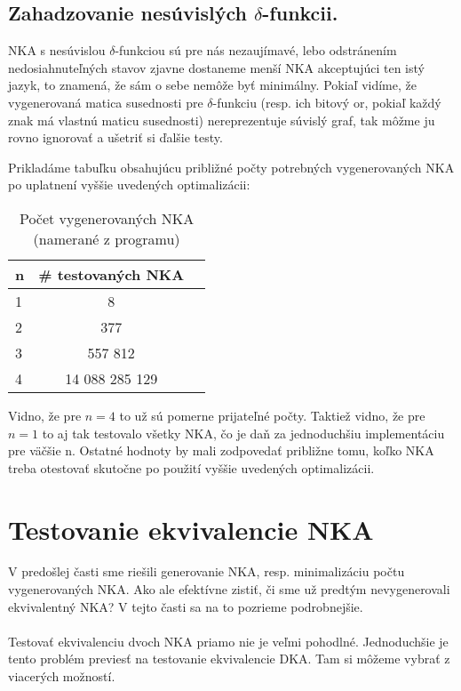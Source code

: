 \subsection{Zahadzovanie nesúvislých $\delta$-funkcii.} NKA s nesúvislou $\delta$-funkciou sú pre nás nezaujímavé, lebo odstránením nedosiahnuteľných stavov zjavne dostaneme menší NKA akceptujúci ten istý jazyk, to znamená, že sám o sebe nemôže byť minimálny. Pokiaľ vidíme, že vygenerovaná matica susednosti pre $\delta$-funkciu (resp. ich bitový or, pokiaľ každý znak má vlastnú maticu susednosti) nereprezentuje súvislý graf, tak môžme ju rovno ignorovať a ušetriť si ďalšie testy.   



Prikladáme tabuľku obsahujúcu približné počty potrebných vygenerovaných NKA po uplatnení vyššie uvedených optimalizácii:

\begin{table}[h]
  \centering
  \begin{tabular}{|l|c|r|}
    \hline
    n & \# testovaných NKA \\
    \hline
    1 & 8 \\ 
    \hline
    2 & 377 \\ 
    \hline
    3 & 557 812 \\
    \hline
    4 & 14 088 285 129 \\
    \hline
  \end{tabular}
  
  \caption{Počet vygenerovaných NKA (namerané z programu)}
  
  \label{tab:pocVsNKA}
\end{table}
Vidno, že pre $n=4$ to už sú pomerne prijateľné počty. Taktiež vidno, že pre $n=1$ to aj tak testovalo všetky NKA, čo je daň za jednoduchšiu implementáciu pre väčšie n. Ostatné hodnoty by mali zodpovedať približne tomu, koľko NKA treba otestovať skutočne po použití vyššie uvedených optimalizácii.

\section{Testovanie ekvivalencie NKA}
V predošlej časti sme riešili generovanie NKA, resp. minimalizáciu počtu vygenerovaných NKA. Ako ale efektívne zistiť, či sme už predtým nevygenerovali ekvivalentný NKA? V tejto časti sa na to pozrieme podrobnejšie.

\paragraph{}
Testovať ekvivalenciu dvoch NKA priamo nie je veľmi pohodlné. Jednoduchšie je tento problém previesť na testovanie ekvivalencie DKA. Tam si môžeme vybrať z viacerých možností.

